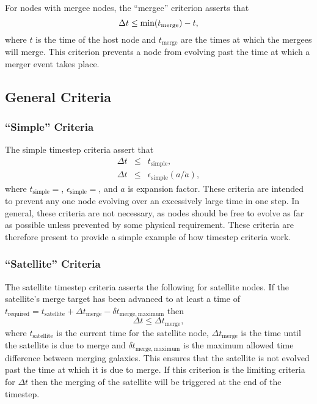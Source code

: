 For \glspl{node} with \gls{mergee} \glspl{node}, the ``\gls{mergee}'' criterion asserts that
\begin{equation}
 \Delta t \le \hbox{min}(t_\mathrm{merge}) - t,
\end{equation}
where $t$ is the time of the host \gls{node} and $t_\mathrm{merge}$ are the times at which the \glspl{mergee} will merge. This criterion prevents a \gls{node} from evolving past the time at which a merger event takes place.

\subsection{General Criteria}

\subsubsection{``Simple'' Criteria}\label{phys:mergerTreeEvolveTimestep:mergerTreeEvolveTimestepSimple}

The {\normalfont \ttfamily simple} timestep criteria assert that
\begin{eqnarray}
\Delta t &\le& t_\mathrm{simple}, \\
\Delta t &\le& \epsilon_\mathrm{simple} (a/\dot{a}),
\end{eqnarray}
where $t_\mathrm{simple}=${\normalfont \ttfamily [timestepSimpleAbsolute]}, $\epsilon_\mathrm{simple}=${\normalfont \ttfamily [timestepSimpleRelative]}, and $a$ is expansion factor. These criteria are intended to prevent any one node evolving over an excessively large time in one step. In general, these criteria are not necessary, as nodes should be free to evolve as far as possible unless prevented by some physical requirement. These criteria are therefore present to provide a simple example of how timestep criteria work.

\subsubsection{``Satellite'' Criteria}\label{phys:mergerTreeEvolveTimestep:mergerTreeEvolveTimestepSatellite}

The {\normalfont \ttfamily satellite} timestep criteria asserts the following for satellite \glspl{node}. If the satellite's merge target has been advanced to at least a time of $t_\mathrm{required} = t_\mathrm{satellite} + \Delta t_\mathrm{merge} - \delta t_\mathrm{merge,maximum}$ then 
\begin{equation}
\Delta t \le \Delta t_\mathrm{merge},
\end{equation}
where $t_\mathrm{satellite}$ is the current time for the satellite \gls{node}, $\Delta t_\mathrm{merge}$ is the time until the satellite is due to merge and $\delta t_\mathrm{merge,maximum}$ is the maximum allowed time difference between merging galaxies. This ensures that the satellite is not evolved past the time at which it is due to merge. If this criterion is the limiting criteria for $\Delta t$ then the merging of the satellite will be triggered at the end of the timestep.

